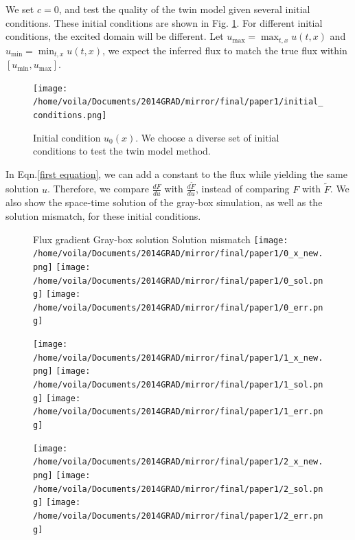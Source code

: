 \documentclass[a4paper,onecolumn]{article}
\theoremstyle{remark}
\begin{document}
\indent We set $c=0$, and test the quality of the twin model given several initial conditions.
These initial conditions are shown in Fig. \ref{fig:initial condition}.
For different initial conditions, the excited domain will be different.
Let $u_{\max} = \max_{t,x}u(t,x)$ and $u_{\min} = \min_{t,x}u(t,x)$,
we expect the inferred flux to match the true flux within $[u_{\min},u_{\max}]$.
\begin{figure}[H]\begin{center}
    \texttt{[image: /home/voila/Documents/2014GRAD/mirror/final/paper1/initial\_conditions.png]}
    \caption{Initial condition $u_0(x)$. 
    We choose a diverse set of initial conditions to test the twin model method.}
    \label{fig:initial condition}
\end{center}\end{figure}
\indent In Eqn.\eqref{first equation},
we can add a constant to the flux while yielding the same solution $u$. 
Therefore, we compare $\frac{dF}{du}$ with $\frac{d\tilde{F}}{du}$, instead of comparing
$F$ with $\tilde{F}$. We also show the
space-time solution of the gray-box simulation, as well as the solution mismatch, for these initial conditions.\\
\begin{figure}[H]\begin{center}
    Flux gradient\hspace{2cm} Gray-box solution \hspace{2cm} Solution mismatch
    \texttt{[image: /home/voila/Documents/2014GRAD/mirror/final/paper1/0\_x\_new.png]}
    \texttt{[image: /home/voila/Documents/2014GRAD/mirror/final/paper1/0\_sol.png]}
    \texttt{[image: /home/voila/Documents/2014GRAD/mirror/final/paper1/0\_err.png]}
    \label{fig:sol compare}
\end{center}\end{figure}
\vspace{-1cm}
\begin{figure}[H]\begin{center}
    \texttt{[image: /home/voila/Documents/2014GRAD/mirror/final/paper1/1\_x\_new.png]}
    \texttt{[image: /home/voila/Documents/2014GRAD/mirror/final/paper1/1\_sol.png]}
    \texttt{[image: /home/voila/Documents/2014GRAD/mirror/final/paper1/1\_err.png]}
    \label{fig:sol compare}
\end{center}\end{figure}
\vspace{-1cm}
\begin{figure}[H]\begin{center}
    \texttt{[image: /home/voila/Documents/2014GRAD/mirror/final/paper1/2\_x\_new.png]}
    \texttt{[image: /home/voila/Documents/2014GRAD/mirror/final/paper1/2\_sol.png]}
    \texttt{[image: /home/voila/Documents/2014GRAD/mirror/final/paper1/2\_err.png]}
    \label{fig:sol compare}
\end{center}\end{figure}
\end{document}
